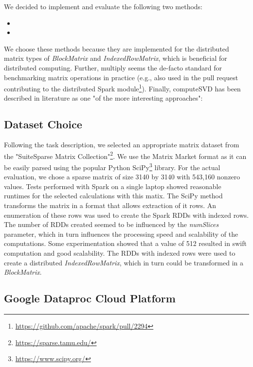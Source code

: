 \documentclass{prog_report}
\newcommand{\footurl}[1]{\footnote{\url{#1}}}
\begin{document}
We decided to implement and evaluate the following two methods:
\begin{itemize}
    \item {}
    \item {}
\end{itemize}
We choose these methods because they are implemented for the distributed matrix types of \emph{BlockMatrix} and \emph{IndexedRowMatrix}, which is beneficial for distributed computing.
Further, multiply seems the de-facto standard for benchmarking matrix operations in practice (e.g., also used in the pull request contributing to the distributed Spark module\footurl{https://github.com/apache/spark/pull/2294}).
Finally, computeSVD has been described in literature as one "of the more interesting approaches"\cite{bosagh-zadeh:16}:

\subsection{Dataset Choice}

Following the task description, we selected an appropriate matrix dataset from the "SuiteSparse Matrix Collection"\footurl{https://sparse.tamu.edu/}.
We use the  Matrix Market format as it can be easily parsed using the popular Python SciPy\footurl{https://www.scipy.org/} library.
For the actual evaluation, we chose a sparse matrix of size 3140 by 3140 with 543,160 nonzero values. 
Tests performed with Spark on a single laptop showed reasonable runtimes for the selected calculations with this matix.
The SciPy method  transforms the matrix in a format that allows extraction of it rows. 
An enumeration of these rows was used to create the Spark RDDs with indexed rows. 
The number of RDDs created seemed to be influenced by the \emph{numSlices} parameter, which in turn influences the processing speed and scalability of the computations.
Some experimentation showed that a value of 512 resulted in swift computation and good scalability.
The RDDs with indexed rows were used to create a distributed \emph{IndexedRowMatrix}, which in turn could be transformed in a \emph{BlockMatrix}. 

\subsection{Google Dataproc Cloud Platform}
\end{document}
